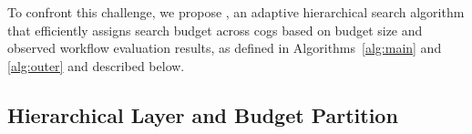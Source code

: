 To confront this challenge, we propose \textit{\textbf{\search}}, an adaptive hierarchical search algorithm that efficiently assigns search budget across cogs based on budget size and observed workflow evaluation results, as defined in Algorithms~\ref{alg:main} and \ref{alg:outer} and described below.






\subsection{Hierarchical Layer and Budget Partition}
\label{sec:ssp}

